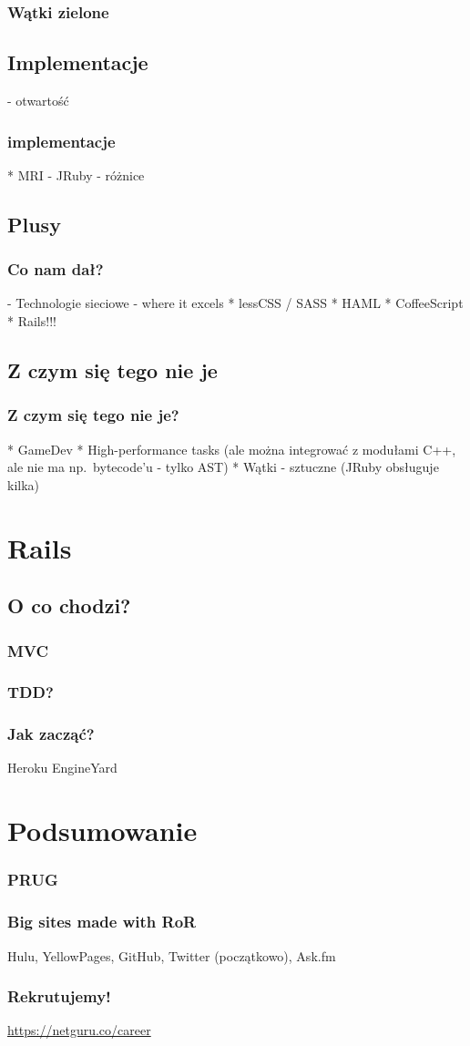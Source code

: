\documentclass{beamer}
\begin{document}
\begin{frame}[fragile]
\frametitle{Wątki zielone}
\end{frame}
\subsection{Implementacje}
 - otwartość

\begin{frame}[fragile]
\frametitle{implementacje}
    * MRI
    - JRuby - różnice
\end{frame}



\subsection{Plusy}

\begin{frame}[fragile]
\frametitle{Co nam dał?}

- Technologie sieciowe - where it excels
* lessCSS / SASS
* HAML
* CoffeeScript
* Rails!!!
\end{frame}

\subsection{Z czym się tego nie je}

\begin{frame}[fragile]
\frametitle{Z czym się tego nie je?}
    * GameDev
    * High-performance tasks (ale można integrować z modułami C++, ale nie ma np.\ bytecode'u - tylko AST)
    * Wątki - sztuczne (JRuby obsługuje kilka)
\end{frame}

\section{Rails}
\subsection{O co chodzi?}
\begin{frame}[fragile]
\frametitle{MVC}

\end{frame}

\begin{frame}[fragile]
\frametitle{TDD?}
\end{frame}

\begin{frame}[fragile]
\frametitle{Jak zacząć?}

Heroku 
EngineYard
\end{frame}



\section{Podsumowanie}

\begin{frame}[fragile]
\frametitle{PRUG}
\end{frame}

\begin{frame}[fragile]
\frametitle{Big sites made with RoR}
Hulu, YellowPages, GitHub, Twitter (początkowo), Ask.fm
\end{frame}

\begin{frame}[fragile]
\frametitle{Rekrutujemy!}
\url{https://netguru.co/career}
\end{frame}
\end{document}
